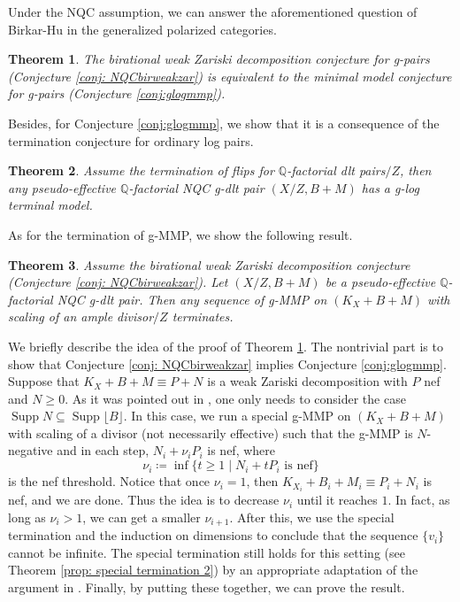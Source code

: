 \documentclass[11pt]{amsart}
\newcommand{\Qq}{\mathbb{Q}}
\newcommand{\Supp}{\operatorname{Supp}}
\newcommand{\lf}{\lfloor}
\newcommand{\rf}{\rfloor}
\newtheorem{theorem}{Theorem}[section]
\begin{document}
Under the NQC assumption, we can answer the aforementioned question of Birkar-Hu in the generalized polarized categories.

\begin{theorem}\label{thm: weak zariski equiv mm}
The birational weak Zariski decomposition conjecture for g-pairs (Conjecture \ref{conj: NQCbirweakzar}) is equivalent to the minimal model conjecture for g-pairs (Conjecture \ref{conj:glogmmp}). 
\end{theorem}

Besides, for Conjecture \ref{conj:glogmmp}, we show that it is a consequence of the termination conjecture for ordinary log pairs. 

\begin{theorem}\label{thm: ter lc implies g-log minimal model}
Assume the termination of flips for $\Qq$-factorial dlt pairs$/Z$, then any pseudo-effective $\Qq$-factorial NQC g-dlt pair $(X/Z,B+M)$ has a g-log terminal model. 
\end{theorem}

As for the termination of g-MMP, we show the following result.

\begin{theorem}\label{thm: weak zariski scaling ample}
Assume the birational weak Zariski decomposition conjecture (Conjecture \ref{conj: NQCbirweakzar}). Let $(X/Z,B+M)$ be a pseudo-effective $\Qq$-factorial NQC g-dlt pair. Then any sequence of g-MMP on $(K_X+B+M)$ with scaling of an ample divisor$/Z$ terminates.
\end{theorem}

We briefly describe the idea of the proof of Theorem \ref{thm: weak zariski equiv mm}. The nontrivial part is to show that Conjecture \ref{conj: NQCbirweakzar} implies Conjecture \ref{conj:glogmmp}. Suppose that $K_X+B+M \equiv P+N$ is a weak Zariski decomposition with $P$ nef and $N \geq 0$. As it was pointed out in \cite[\S 6]{Birkarhuweak14}, one only needs to consider the case $\Supp N \subseteq \Supp\lf B\rf$. In this case, we run a special g-MMP on $(K_X+B+M)$ with scaling of a divisor (not necessarily effective) such that the g-MMP is $N$-negative and in each step, $N_i+\nu_i P_i$ is nef, where
\[
\nu_i \coloneqq \inf\{t \geq 1 \mid N_i+tP_i\text{~is nef}\}
\] is the nef threshold. Notice that once $\nu_i=1$, then $K_{X_i}+B_i+M_i \equiv P_i+N_i$ is nef, and we are done. Thus the idea is to decrease $\nu_i$ until it reaches $1$. In fact, as long as $\nu_i>1$, we can get a smaller $\nu_{i+1}$. After this, we use the special termination and the induction on dimensions to conclude that the sequence $\{v_i\}$ cannot be infinite. The special termination still holds for this setting (see Theorem \ref{prop: special termination 2}) by an appropriate adaptation of the argument in \cite{Birkar12}. Finally, by putting these together, we can prove the result.
\end{document}

